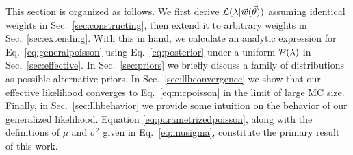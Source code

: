 This section is organized as follows.
We first derive $\mathcal{L}(\lambda|\vec{w}(\vec{\theta}))$ assuming identical weights in Sec.~\ref{sec:constructing}, then extend it to arbitrary weights in Sec.~\ref{sec:extending}.
With this in hand, we calculate an analytic expression for Eq.~\eqref{eq:generalpoisson} using Eq.~\eqref{eq:posterior} under a uniform $\mathcal{P}(\lambda)$ in Sec.~\ref{sec:effective}.
In Sec.~\ref{sec:priors} we briefly discuss a family of distributions as possible alternative priors.
In Sec.~\ref{sec:llhconvergence} we show that our effective likelihood converges to Eq.~\eqref{eq:mcpoisson} in the limit of large MC size.
Finally, in Sec.~\ref{sec:llhbehavior} we provide some intuition on the behavior of our generalized likelihood.
Equation \eqref{eq:parametrizedpoisson}, along with the definitions of $\mu$ and $\sigma^2$ given in Eq.~\eqref{eq:musigma}, constitute the primary result of this work.
